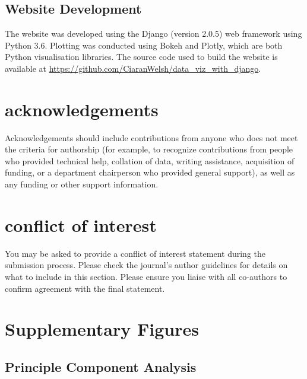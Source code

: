 \documentclass[alpha-refs]{wiley-article}
\begin{document}
\subsection{Website Development}
The website was developed using the Django (version 2.0.5) web framework using Python 3.6. Plotting was conducted using Bokeh and Plotly, which are both Python visualisation libraries. The source code used to build the website is available at \url{https://github.com/CiaranWelsh/data_viz_with_django}. 

\section*{acknowledgements}
Acknowledgements should include contributions from anyone who does not meet the criteria for authorship (for example, to recognize contributions from people who provided technical help, collation of data, writing assistance, acquisition of funding, or a department chairperson who provided general support), as well as any funding or other support information.

\section*{conflict of interest}
You may be asked to provide a conflict of interest statement during the submission process. Please check the journal's author guidelines for details on what to include in this section. Please ensure you liaise with all co-authors to confirm agreement with the final statement.

\printendnotes



\section{Supplementary Figures}
\subsection{Principle Component Analysis}
\end{document}
